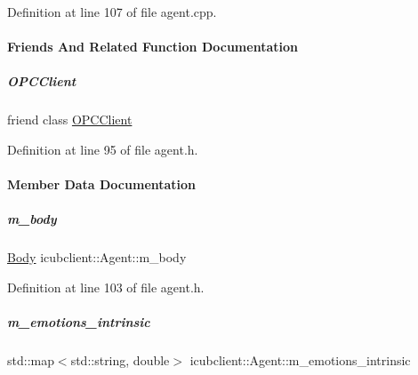 Definition at line 107 of file agent.\+cpp.



\paragraph{Friends And Related Function Documentation}
\mbox{\label{group__icubclient__representations_a80f0caa9925206967111a3d2713874a2}} 
\subparagraph{\texorpdfstring{O\+P\+C\+Client}{OPCClient}}
{\footnotesize\ttfamily friend class \hyperlink{group__icubclient__clients_classicubclient_1_1OPCClient}{O\+P\+C\+Client}\hspace{0.3cm}{\ttfamily [friend]}}



Definition at line 95 of file agent.\+h.



\paragraph{Member Data Documentation}
\mbox{\label{group__icubclient__representations_a6ab805862ead5247cd5cbd99f5c6da76}} 
\subparagraph{\texorpdfstring{m\+\_\+body}{m\_body}}
{\footnotesize\ttfamily \hyperlink{group__icubclient__representations_structicubclient_1_1Body}{Body} icubclient\+::\+Agent\+::m\+\_\+body}



Definition at line 103 of file agent.\+h.

\mbox{\label{group__icubclient__representations_a714610cafc5f7b7942badedd056ae87e}} 
\subparagraph{\texorpdfstring{m\+\_\+emotions\+\_\+intrinsic}{m\_emotions\_intrinsic}}
{\footnotesize\ttfamily std\+::map$<$std\+::string, double$>$ icubclient\+::\+Agent\+::m\+\_\+emotions\+\_\+intrinsic}



